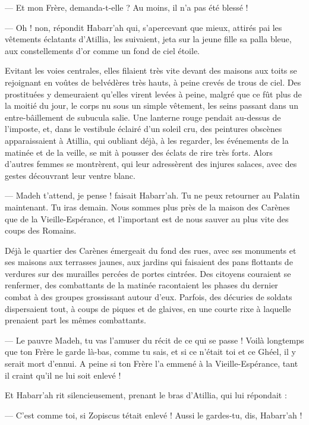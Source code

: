 \documentclass[a4paper, 11pt, oneside, polutonikogreek, french]{article}
\begin{document}
--- Et mon Frère, demanda-t-elle ? Au moins, il n'a pas été blessé !

--- Oh ! non, répondit Habarr'ah qui, s'apercevant que mieux, attirés pai les vêtements éclatants d'Atillia, les suivaient, jeta sur la jeune fille sa palla bleue, aux constellements d'or comme un fond de ciel étoile.

Evitant les voies centrales, elles filaient très vite devant des maisons aux toits se rejoignant en voûtes de belvédères très hauts, à peine crevés de trous de ciel. Des prostituées y demeuraient qu'elles virent levées à peine, malgré que ce fût plus de la moitié du jour, le corps nu sous un simple vêtement, les seins passant dans un entre-bâillement de subucula salie. Une lanterne rouge pendait au-dessus de l'imposte, et, dans le vestibule éclairé d'un soleil cru, des peintures obscènes apparaissaient à Atillia, qui oubliant déjà, à les regarder, les événements de la matinée et de la veille, se mit à pousser des éclats de rire très forts. Alors d'autres femmes se montrèrent, qui leur adressèrent des injures salaces, avec des gestes découvrant leur ventre blanc.

--- Madeh t'attend, je pense ! faisait Habarr'ah. Tu ne peux retourner au Palatin maintenant. Tu iras demain. Nous sommes plus près de la maison des Carènes que de la Vieille-Espérance, et l'important est de nous sauver au plus vite des coups des Romains.

Déjà le quartier des Carènes émergeait du fond des rues, avec ses monuments et ses maisons aux terrasses jaunes, aux jardins qui faisaient des pans flottants de verdures sur des murailles percées de portes cintrées. Des citoyens couraient se renfermer, des combattants de la matinée racontaient les phases du dernier combat à des groupes grossissant autour d'eux. Parfois, des décuries de soldats dispersaient tout, à coups de piques et de glaives, en une courte rixe à laquelle prenaient part les mêmes combattants.

--- Le pauvre Madeh, tu vas l'amuser du récit de ce qui se passe ! Voilà longtemps que ton Frère le garde là-bas, comme tu sais, et si ce n'était toi et ce Ghéel, il y serait mort d'ennui. A peine si ton Frère l'a emmené à la Vieille-Espérance, tant il craint qu'il ne lui soit enlevé !

Et Habarr'ah rit silencieusement, prenant le bras d'Atillia, qui lui répondait :

--- C'est comme toi, si Zopiscus tétait enlevé ! Aussi le gardes-tu, dis, Habarr'ah !
\end{document}

